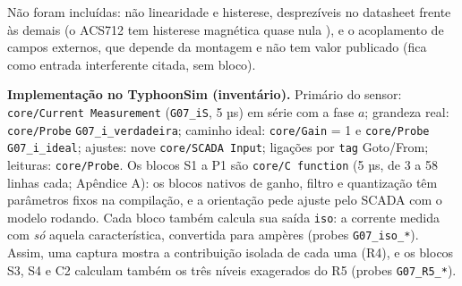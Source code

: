 \documentclass[10pt,a4paper]{article}
\begin{document}
Não foram incluídas: não linearidade e histerese, desprezíveis no datasheet frente às demais (o ACS712 tem histerese magnética quase nula \cite{acs712}), e o acoplamento de campos externos, que depende da montagem e não tem valor publicado (fica como entrada interferente citada, sem bloco).

\textbf{Implementação no TyphoonSim (inventário).} Primário do sensor: \texttt{core/Current Measurement} (\texttt{G07\_iS}, 5 µs) em série com a fase $a$; grandeza real: \texttt{core/Probe} \texttt{G07\_i\_verdadeira}; caminho ideal: \texttt{core/Gain} = 1 e \texttt{core/Probe} \texttt{G07\_i\_ideal}; ajustes: nove \texttt{core/SCADA Input}; ligações por \texttt{tag} Goto/From; leituras: \texttt{core/Probe}. Os blocos S1 a P1 são \texttt{core/C function} (5 µs, de 3 a 58 linhas cada; Apêndice A): os blocos nativos de ganho, filtro e quantização têm parâmetros fixos na compilação, e a orientação pede ajuste pelo SCADA com o modelo rodando. Cada bloco também calcula sua saída \texttt{iso}: a corrente medida com \emph{só} aquela característica, convertida para ampères (probes \texttt{G07\_iso\_*}). Assim, uma captura mostra a contribuição isolada de cada uma (R4), e os blocos S3, S4 e C2 calculam também os três níveis exagerados do R5 (probes \texttt{G07\_R5\_*}).
\end{document}
